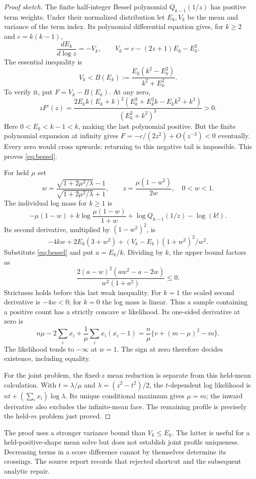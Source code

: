 \documentclass[12pt]{article}
\theoremstyle{definition}
\theoremstyle{remark}
\begin{document}
\begin{proof}[Proof sketch]
The finite half-integer Bessel polynomial $Q_{k-1}(1/z)$ has positive term
weights. Under their normalized distribution let $E_k,V_k$ be the mean and
variance of the term index. Its polynomial differential equation gives, for
$k\ge2$ and $c=k(k-1)$,
\[
 \frac{dE_k}{d\log z}=-V_k,\qquad
 V_k=c-(2z+1)E_k-E_k^2.
\]
The essential inequality is
\begin{equation}\label{eq:bessel}
 V_k< B(E_k):=\frac{E_k(k^2-E_k^2)}{k^2+E_k^2}.
\end{equation}
To verify it, put $F=V_k-B(E_k)$. At any zero,
\[
 zF'(z)=\frac{2E_k k(E_k+k)^2
 (E_k^3+E_k^2k-E_kk^2+k^3)}{(E_k^2+k^2)^3}>0.
\]
Here $0<E_k<k-1<k$, making the last polynomial positive. But the finite
polynomial expansion at infinity gives $F=-c/(2z^2)+O(z^{-3})<0$ eventually.
Every zero would cross upwards; returning to this negative tail is
impossible. This proves \eqref{eq:bessel}.

For held $\mu$ set
\[
 w=\frac{\sqrt{1+2\mu^2/\lambda}-1}{\sqrt{1+2\mu^2/\lambda}+1},
 \qquad z=\frac{\mu(1-w^2)}{2w},\quad 0<w<1.
\]
The individual log mass for $k\ge1$ is
\[
 -\mu(1-w)+k\log\frac{\mu(1-w)}{1+w}
 +\log Q_{k-1}(1/z)-\log(k!).
\]
Its second derivative, multiplied by $(1-w^2)^2$, is
\[
 -4kw+2E_k(3+w^2)+(V_k-E_k)(1+w^2)^2/w^2.
\]
Substitute \eqref{eq:bessel} and put $a=E_k/k$. Dividing by $k$, the upper
bound factors as
\[
 \frac{2(a-w)^2(aw^2-a-2w)}{w^2(1+a^2)}\le0.
\]
Strictness holds before this last weak inequality. For $k=1$ the scaled
second derivative is $-4w<0$; for $k=0$ the log mass is linear. Thus a sample
containing a positive count has a strictly concave $w$ likelihood. Its
one-sided derivative at zero is
\[
 n\mu-2\sum_i x_i+\frac1\mu\sum_i x_i(x_i-1)
 =\frac n\mu\{v+(m-\mu)^2-m\}.
\]
The likelihood tends to $-\infty$ at $w=1$. The sign at zero therefore
decides existence, including equality.

For the joint problem, the fixed-$z$ mean reduction is separate from this
held-mean calculation. With $t=\lambda/\mu$ and
$\lambda=(z^2-t^2)/2$, the $t$-dependent log likelihood is
$nt+(\sum_i x_i)\log\lambda$. Its unique conditional maximum gives $\mu=m$;
the inward derivative also excludes the infinite-mean face. The remaining
profile is precisely the held-$m$ problem just proved.
\end{proof}
The proof uses a stronger variance bound than $V_k\le E_k$. The latter is
useful for a held-positive-shape mean solve but does not establish joint
profile uniqueness. Decreasing terms in a score difference cannot by
themselves determine its crossings. The source report records that rejected
shortcut and the subsequent analytic repair.
\end{document}
